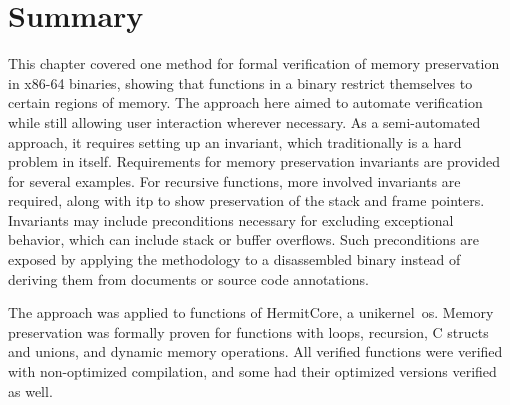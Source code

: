 \section{Summary}
This chapter covered one method for formal verification
of memory preservation in x86-64 binaries,
showing that functions in a binary restrict themselves to certain regions of memory.
The approach here aimed to automate verification
while still allowing user interaction wherever necessary.
As a semi-automated approach,
it requires setting up an invariant, which traditionally is a hard problem in itself.
Requirements for memory preservation invariants are provided for several examples.
For recursive functions, more involved invariants are required,
along with \ac{itp} to show preservation of the stack and frame pointers.
Invariants may include preconditions necessary for excluding exceptional behavior,
which can include stack or buffer overflows.
Such preconditions are exposed by applying the methodology to a disassembled binary
instead of deriving them from documents or source code annotations.

The approach was applied to functions of HermitCore, a unikernel~\ac{os}.
Memory preservation was formally proven for functions with loops, recursion,
C structs and unions, and dynamic memory operations.
All verified functions were verified with non-optimized compilation,
and some had their optimized versions verified as well.
